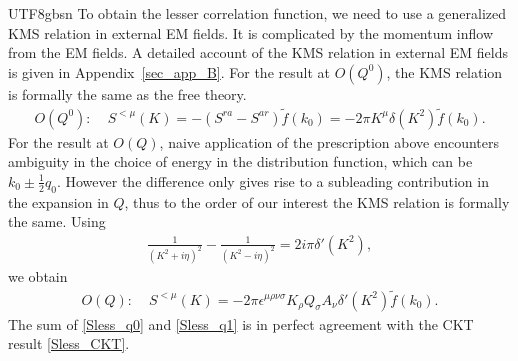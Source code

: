 \documentclass[11pt]{article}\def\baselinestretch{1.4}
\def\d{{\delta}}
\def\e{{\epsilon}}
\def\h{\eta}
\def\p{{\pi}}
\def\m{{\mu}}
\def\n{{\nu}}
\def\r{{\rho}}
\def\s{{\sigma}}
\begin{document}
\begin{CJK}{UTF8}{gbsn}
To obtain the lesser correlation function, we need to use a generalized KMS relation in external EM fields. It is complicated by the momentum inflow from the EM fields. A detailed account of the KMS relation in external EM fields is given in Appendix~\ref{sec_app_B}. For the result at $O(Q^0)$, the KMS relation is formally the same as the free theory. 
\begin{align}\label{Sless_q0}
    O(Q^0):&\; S^{<\m}(K)=-(S^{ra}-S^{ar})\tilde{f}(k_0)=-2\p K^\m\d(K^2)\tilde{f}(k_0).
\end{align}
For the result at $O(Q)$, naive application of the prescription above encounters ambiguity in the choice of energy in the distribution function, which can be $k_0\pm\frac{1}{2}q_0$. However the difference only gives rise to a subleading contribution in the expansion in $Q$, thus to the order of our interest the KMS relation is formally the same. Using
\begin{align}
    \frac{1}{(K^2+i\h)^2}-\frac{1}{(K^2-i\h)^2}=2i\p\d'(K^2),
\end{align}
we obtain
\begin{align}\label{Sless_q1}
    O(Q):&\; S^{<\m}(K)=-2\p \e^{\m\r\n\s}K_\r Q_\s A_\n \d'(K^2)\tilde{f}(k_0).
\end{align}
The sum of \eqref{Sless_q0} and \eqref{Sless_q1} is in perfect agreement with the CKT result \eqref{Sless_CKT}.


\end{CJK}
\end{document}
